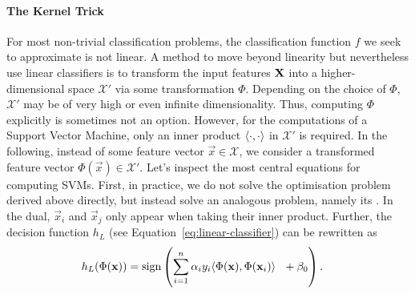 \documentclass[
	fontsize=10pt, %
	twoside=true, %
	secnumdepth=1, %
  toc=indentunnumbered %
]{kaobook}
\begin{document}
\paragraph{The Kernel Trick} For most non-trivial classification problems, the
classification function $f$ we seek to approximate is not linear. A method to
move beyond linearity but nevertheless use linear classifiers is to transform
the input features $\mathbf{X}$ into a higher-dimensional space $\mathcal{X}'$ via
some transformation $\Phi$. Depending on the choice of $\Phi$, $\mathcal{X'}$
may be of very high or even infinite dimensionality. Thus, computing $\Phi$
explicitly is sometimes not an option. However, for the computations of a
Support Vector Machine, only an inner product $\langle \cdot, \cdot \rangle$ in
$\mathcal{X}'$ is required. In the following, instead of some feature vector
$\vec x \in \mathcal{X}$, we consider a transformed feature vector $\Phi(\vec x)
\in \mathcal{X} '$.
%
Let's inspect the most central equations for computing SVMs. First, in practice,
we do not solve the optimisation problem derived above directly, but instead
solve an analogous problem, namely its . In the dual, $\vec
x_i$ and $\vec x_j$ only appear when taking their inner product.
%
Further, the decision function $h_L$ (see Equation~\ref{eq:linear-classifier}) can be
rewritten as
\begin{align*}
  h_L(\Phi(\mathbf{x})) & = \text{sign}\left( \sum_{i=1}^n \alpha_i y_i \langle \Phi(\mathbf{x}), \Phi(\mathbf{x}_i) \rangle ~~ + \beta_0 \right).
\end{align*}
\end{document}
